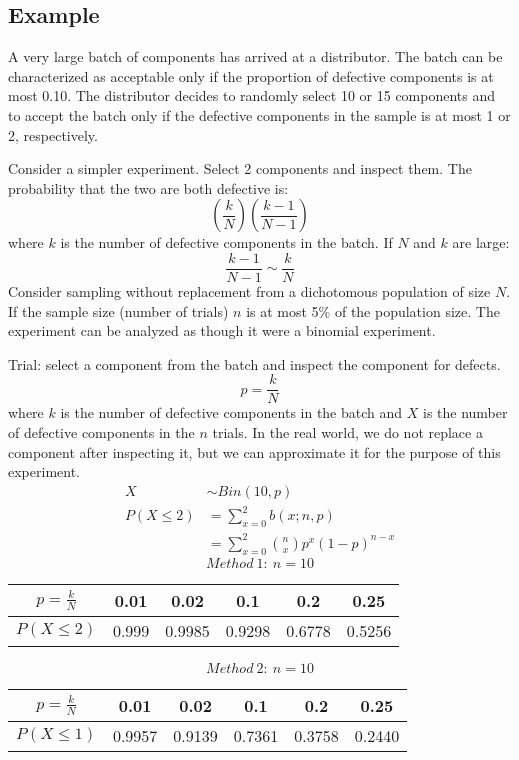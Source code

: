 \documentclass[letterpaper, 12pt]{math}
\begin{document}
\subsection*{Example}
A very large batch of components has arrived at a distributor. The batch
can be characterized as acceptable only if the proportion of defective
components is at most 0.10. The distributor decides to randomly select 10 or
15 components and to accept the batch only if the defective components in the
sample is at most 1 or 2, respectively. \par
Consider a simpler experiment. Select 2 components and inspect them. The
probability that the two are both defective is:
\[ (\frac{k}{N})(\frac{k-1}{N-1}) \]
where \( k \) is the number of defective components in the batch. If \( N \)
and \( k \) are large:
\[ \frac{k-1}{N-1}\sim\frac{k}{N} \]
Consider sampling without replacement from a dichotomous population of size
\( N \). If the sample size (number of trials) \( n \) is at most 5\% of the
population size. The experiment can be analyzed as though it were a binomial
experiment. \par
Trial: select a component from the batch and inspect the component for defects.
\[ p = \frac{k}{N} \]
where \( k \) is the number of defective components in the batch and \( X \) is
the number of defective components in the \( n \) trials. In the real world,
we do not replace a component after inspecting it, but we can approximate it
for the purpose of this experiment.
\begin{align*}
  X &\sim Bin(10,p) \\
  P(X\leq 2) &= \sum_{x=0}^{2}b(x;n,p) \\
  &= \sum_{x=0}^{2}\binom{n}{x}p^{x}(1-p)^{n-x}
\end{align*}
\[ Method\ 1:\ n = 10 \]
\begin{center}
  \begin{tabular}{|c|c|c|c|c|c|}
    \hline
    \( p = \frac{k}{N} \) & 0.01 & 0.02 & 0.1 & 0.2 & 0.25 \\
    \hline
    \( P(X\leq 2) \) & 0.999 & 0.9985 & 0.9298 & 0.6778 & 0.5256 \\
    \hline
  \end{tabular}
\end{center}
\[ Method\ 2:\ n = 10 \]
\begin{center}
  \begin{tabular}{|c|c|c|c|c|c|}
    \hline
    \( p = \frac{k}{N} \) & 0.01 & 0.02 & 0.1 & 0.2 & 0.25 \\
    \hline
    \( P(X\leq 1) \) & 0.9957 & 0.9139 & 0.7361 & 0.3758 & 0.2440 \\
    \hline
  \end{tabular}
\end{center}
\end{document}
